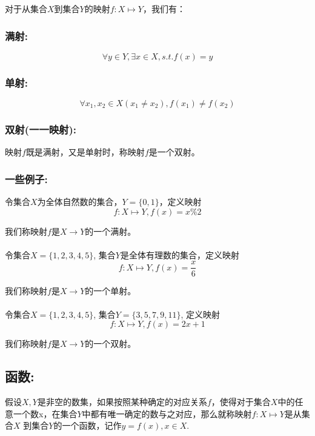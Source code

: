 \documentclass[UTF8]{article}
\begin{document}
对于从集合$X$到集合$Y$的映射$f: X \mapsto Y$，我们有：

\subsubsection{满射:}

$$\forall y \in Y, \exists x \in X, s.t. f(x) = y$$


\subsubsection{单射:}

$$\forall x_1, x_2 \in X (x_1\neq x_2), f(x_1) \neq f(x_2)$$

\subsubsection{双射(一一映射):}

映射$f$既是满射，又是单射时，称映射$f$是一个双射。

\subsubsection{一些例子:}

令集合$X$为全体自然数的集合，$Y = \{0, 1\}$，定义映射$$f : X\mapsto Y, f(x) = x\%2$$

我们称映射$f$是$X\to Y$的一个满射。\\
\\

令集合$X = \{1, 2, 3, 4, 5\}$, 集合$Y$是全体有理数的集合，定义映射$$f:X\mapsto Y, f(x) = \frac{x}{6}$$

我们称映射$f$是$X\to Y$的一个单射。\\
\\

令集合$X = \{1, 2, 3, 4, 5\}$, 集合$Y = \{3, 5, 7, 9, 11\}$, 定义映射$$f:X\mapsto Y, f(x) = 2x + 1$$

我们称映射$f$是$X\to Y$的一个双射。\\


\subsection{函数:}

假设$X, Y$是非空的数集，如果按照某种确定的对应关系$f$，使得对于集合$X$中的任意一个数x，在集合$Y$中都有唯一确定的数与之对应，那么就称映射$f:X\mapsto Y$是从集合$X$ 到集合$Y$的一个函数，记作$y = f(x), x \in X$.\\
\end{document}
